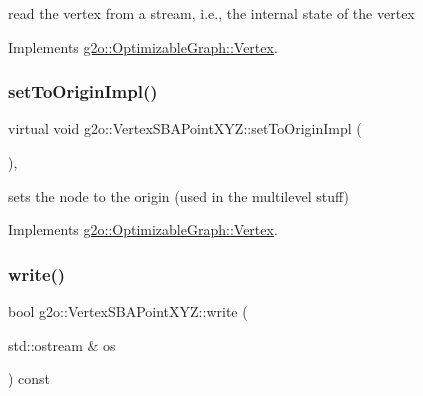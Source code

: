 read the vertex from a stream, i.\+e., the internal state of the vertex 



Implements \mbox{\hyperlink{classg2o_1_1_optimizable_graph_1_1_vertex_a356c40d33c3f1e07afa938dfb4870230}{g2o\+::\+Optimizable\+Graph\+::\+Vertex}}.

\mbox{\label{classg2o_1_1_vertex_s_b_a_point_x_y_z_a787b72465f35a3f30fcbb6b8056b47c4}} 
\subsubsection{\texorpdfstring{set\+To\+Origin\+Impl()}{setToOriginImpl()}}
{\footnotesize\ttfamily virtual void g2o\+::\+Vertex\+S\+B\+A\+Point\+X\+Y\+Z\+::set\+To\+Origin\+Impl (\begin{DoxyParamCaption}{ }\end{DoxyParamCaption})\hspace{0.3cm}{\ttfamily [inline]}, {\ttfamily [virtual]}}



sets the node to the origin (used in the multilevel stuff) 



Implements \mbox{\hyperlink{classg2o_1_1_optimizable_graph_1_1_vertex_abd5fe36815f27a9c174ad41c2070c247}{g2o\+::\+Optimizable\+Graph\+::\+Vertex}}.

\mbox{\label{classg2o_1_1_vertex_s_b_a_point_x_y_z_a6b2fc33f2107c039d441e1bd2a17973a}} 
\subsubsection{\texorpdfstring{write()}{write()}}
{\footnotesize\ttfamily bool g2o\+::\+Vertex\+S\+B\+A\+Point\+X\+Y\+Z\+::write (\begin{DoxyParamCaption}\item[{std\+::ostream \&}]{os }\end{DoxyParamCaption}) const\hspace{0.3cm}{\ttfamily [virtual]}}



